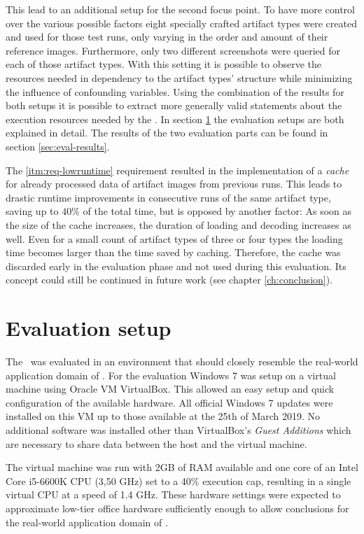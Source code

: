 This lead to an additional setup for the second focus point. To have more control over the various possible factors eight specially crafted artifact types were created and used for those test runs, only varying in the order and amount of their reference images. Furthermore, only two different screenshots were queried for each of those artifact types. With this setting it is possible to observe the resources needed in dependency to the artifact types' structure while minimizing the influence of confounding variables. Using the combination of the results for both setups it is possible to extract more generally valid statements about the execution resources needed by the \vd. In section \ref{sec:eval-env} the evaluation setups are both explained in detail. The results of the two evaluation parts can be found in section \ref{sec:eval-results}.

The \ref{itm:req-lowruntime} requirement resulted in the implementation of a \emph{cache} for already processed data of artifact images from previous runs. This leads to drastic runtime improvements in consecutive runs of the same artifact type, saving up to $40\%$ of the total time, but is opposed by another factor: As soon as the size of the cache increases, the duration of loading and decoding increases as well. Even for a small count of artifact types of three or four types the loading time becomes larger than the time saved by caching. Therefore, the cache was discarded early in the evaluation phase and not used during this evaluation. Its concept could still be continued in future work (see chapter \ref{ch:conclusion}).

\section{Evaluation setup}\label{sec:eval-env}

The \vd~was evaluated in an environment that should closely resemble the real-world application domain of \ape. For the evaluation Windows 7 was setup on a virtual machine using Oracle VM VirtualBox\cite{virtualbox}. This allowed an easy setup and quick configuration of the available hardware. All official Windows 7 updates were installed on this VM up to those available at the 25th of March 2019. No additional software was installed other than VirtualBox's \emph{Guest Additions} which are necessary to share data between the host and the virtual machine.

The virtual machine was run with 2GB of RAM available and one core of an Intel Core i5-6600K CPU (3,50 GHz) set to a 40\% execution cap, resulting in a single virtual CPU at a speed of 1.4 GHz. These hardware settings were expected to approximate low-tier office hardware sufficiently enough to allow conclusions for the real-world application domain of \ape.

